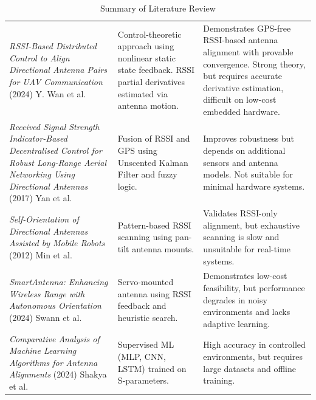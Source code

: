 \begin{longtable}{|
    >{\raggedright\arraybackslash}p{4.3cm} |
    >{\raggedright\arraybackslash}p{4.3cm} |
    >{\raggedright\arraybackslash}p{4.1cm} |}

\caption{Summary of Literature Review}
\label{tab:literature-review} \\
\hline
\multicolumn{1}{|c|}{\parbox[c][2em][c]{4cm}{\centering \textbf{Title}}} &
\multicolumn{1}{c|}{\parbox[c][2em][c]{4.5cm}{\centering \textbf{Methodology}}} &
\multicolumn{1}{c|}{\parbox[c][2em][c]{4.5cm}{\centering \textbf{Key Inferences}}} \\
\hline

\textit{RSSI-Based Distributed Control to Align Directional Antenna Pairs for UAV Communication} (2024) \newline
Y. Wan et al.
&
Control-theoretic approach using nonlinear static state feedback. RSSI partial derivatives estimated via antenna motion.
&
Demonstrates GPS-free RSSI-based antenna alignment with provable convergence. Strong theory, but requires accurate derivative estimation, difficult on low-cost embedded hardware.
\\ \hline

\textit{Received Signal Strength Indicator-Based Decentralised Control for Robust Long-Range Aerial Networking Using Directional Antennas} (2017) \newline
Yan et al.
&
Fusion of RSSI and GPS using Unscented Kalman Filter and fuzzy logic.
&
Improves robustness but depends on additional sensors and antenna models. Not suitable for minimal hardware systems.
\\ \hline

\textit{Self-Orientation of Directional Antennas Assisted by Mobile Robots} (2012) \newline
Min et al.
&
Pattern-based RSSI scanning using pan-tilt antenna mounts.
&
Validates RSSI-only alignment, but exhaustive scanning is slow and unsuitable for real-time systems.
\\ \hline

\textit{SmartAntenna: Enhancing Wireless Range with Autonomous Orientation} (2024) \newline
Swann et al.
&
Servo-mounted antenna using RSSI feedback and heuristic search.
&
Demonstrates low-cost feasibility, but performance degrades in noisy environments and lacks adaptive learning.
\\ \hline

\textit{Comparative Analysis of Machine Learning Algorithms for Antenna Alignments} (2024) \newline
Shakya et al.
&
Supervised ML (MLP, CNN, LSTM) trained on S-parameters.
&
High accuracy in controlled environments, but requires large datasets and offline training.
\\ \hline


\end{longtable}
